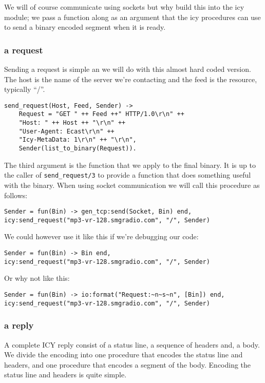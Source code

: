 \documentclass[a4paper,11pt]{article}
\begin{document}
We will of course communicate using sockets but why build this into
the icy module; we pass a function along as an argument that the icy
procedures can use to send a binary encoded segment when it is ready.

\subsubsection{a request}

Sending a request is simple an we will do with this almost hard coded
version. The host is the name of the server we're contacting and the
feed is the resource, typically ``/''. 

\begin{verbatim}
send_request(Host, Feed, Sender) ->
    Request = "GET " ++ Feed ++" HTTP/1.0\r\n" ++ 
    "Host: " ++ Host ++ "\r\n" ++
    "User-Agent: Ecast\r\n" ++
    "Icy-MetaData: 1\r\n" ++ "\r\n",
    Sender(list_to_binary(Request)).
\end{verbatim}

The third argument is the function that we apply to the final
binary. It is up to the caller of {\tt send\_request/3} to provide a
function that does something useful with the binary. When using
socket communication we will call this procedure as follows:

\begin{verbatim}
Sender = fun(Bin) -> gen_tcp:send(Socket, Bin) end,
icy:send_request("mp3-vr-128.smgradio.com", "/", Sender)
\end{verbatim}

We could however use it like this if we're debugging our code:

\begin{verbatim}
Sender = fun(Bin) -> Bin end,
icy:send_request("mp3-vr-128.smgradio.com", "/", Sender)
\end{verbatim}

Or why not like this:

\begin{verbatim}
Sender = fun(Bin) -> io:format("Request:~n~s~n", [Bin]) end,
icy:send_request("mp3-vr-128.smgradio.com", "/", Sender)
\end{verbatim}

\subsubsection{a reply}

A complete ICY reply consist of a status line, a sequence of headers
and, a body. We divide the encoding into one procedure that encodes the
status line and headers, and one procedure that encodes a segment of
the body. Encoding the status line and headers is quite simple.
\end{document}
